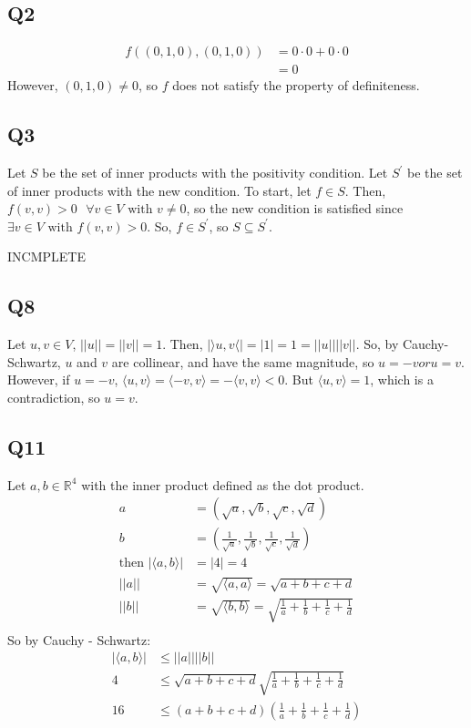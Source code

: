 \documentclass{article}
\begin{document}
\subsection*{Q2}
	\begin{align*}
		f((0, 1, 0), (0, 1, 0)) &= 0 \cdot 0 + 0\cdot 0\\
		&=0
	\end{align*}
	However, $(0, 1, 0) \neq 0$, so $f$ does not satisfy the property of definiteness.
	
\subsection*{Q3}
Let $S$ be the set of inner products with the positivity condition. 
Let  $S^\prime$ be the set of inner products with the new condition. To start, let $f \in S$. Then, $f(v, v) > 0 \text{ } \forall v \in V \text{ with } v \neq 0$, so the new condition is satisfied since $\exists v \in V \text{ with } f(v, v) > 0$. So, $f \in S^\prime$, so $S \subseteq S^\prime$. 
\begin{huge}
INCMPLETE
\end{huge}

\subsection*{Q8}
Let $u, v \in V$, $||u|| = ||v|| = 1$. Then, $|\rangle u, v \langle| = |1| = 1 = ||u|| ||v||$. So, by Cauchy-Schwartz, $u$ and $v$ are collinear, and have the same magnitude, so $u = -v or u = v$. However, if $u = -v$, $\langle u, v \rangle = \langle -v, v \rangle = - \langle v, v \rangle < 0$. But $\langle u, v \rangle = 1$, which is a contradiction, so $u = v$.

\subsection*{Q11}
Let $a,b \in \mathbb{R}^4$ with the inner product defined as the dot product. 
\begin{align*}
	a &= (\sqrt{a}, \sqrt{b}, \sqrt{c}, \sqrt{d})\\
	b &= (\frac{1}{\sqrt{a}}, \frac{1}{\sqrt{b}}, \frac{1}{\sqrt{c}},\frac{1}{\sqrt{d}})\\
	\text{then } |\langle a, b \rangle| &= |4| = 4\\ 
	||a|| &= \sqrt{\langle a, a \rangle} = \sqrt{a + b + c + d}\\
	||b|| &= \sqrt{\langle b, b \rangle} = \sqrt{\frac{1}{a} + \frac{1}{b} + \frac{1}{c} + \frac{1}{d}}\\
\end{align*}
So by Cauchy - Schwartz:
\begin{align*}
	|\langle a, b \rangle| &\leq ||a|| ||b||\\
	4 &\leq \sqrt{a + b + c + d} \sqrt{\frac{1}{a} + \frac{1}{b} + \frac{1}{c} + \frac{1}{d}}\\
	16 &\leq (a+b+c+d)(\frac{1}{a} + \frac{1}{b}+ \frac{1}{c}+\frac{1}{d})\\
\end{align*}
\end{document}

